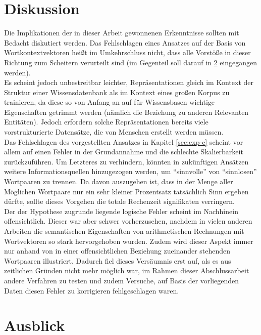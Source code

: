\section{Diskussion}

Die Implikationen der in dieser Arbeit gewonnenen Erkenntnisse sollten mit Bedacht diskutiert werden. Das Fehlschlagen
eines Ansatzes auf der Basis von Wortkontextvektoren heißt im Umkehrschluss nicht, dass alle Vorstöße in dieser
Richtung zum Scheitern verurteilt sind (im Gegenteil soll darauf in \ref{sec:fazit-ausblick} eingegangen werden).\\
Es scheint jedoch unbestreitbar leichter, Repräsentationen gleich im Kontext der Struktur einer Wissensdatenbank als im
Kontext eines großen Korpus zu trainieren, da diese so von Anfang an auf für Wissensbasen wichtige Eigenschaften getrimmt werden
(nämlich die Beziehung zu anderen Relevanten Entitäten). Jedoch erfordern solche Repräsentationen bereits viele
vorstrukturierte Datensätze, die von Menschen erstellt werden müssen.\\

Das Fehlschlagen des vorgestellten Ansatzes in Kapitel \ref{sec:exp-c} scheint vor allem auf einen Fehler in der
Grundannahme und die schlechte Skalierbarkeit zurückzuführen. Um Letzteres zu verhindern, könnten in zukünftigen Ansätzen
weitere Informationsquellen hinzugezogen werden, um ``sinnvolle'' von ``sinnlosen'' Wortpaaren zu trennen. Da davon
auszugehen ist, dass in der Menge aller Möglichen Wortpaare nur ein sehr kleiner Prozentsatz tatsächlich Sinn ergeben
dürfte, sollte dieses Vorgehen die totale Rechenzeit signifikaten verringern.\\
Der der Hypothese zugrunde liegende logische Fehler scheint im Nachhinein offensichtlich. Dieser war aber schwer
vorherzusehen, nachdem in vielen anderen Arbeiten die semantischen Eigenschaften von arithmetischen Rechnungen mit
Wortvektoren so stark hervorgehoben wurden. Zudem wird dieser Aspekt immer nur anhand von in einer offensichtlichen
Beziehung zueinander stehenden Wortpaaren illustriert. Dadurch fiel dieses Versäumnis erst auf, als es aus zeitlichen Gründen
nicht mehr möglich war, im Rahmen dieser Abschlussarbeit andere Verfahren zu testen und zudem Versuche, auf Basis der
vorliegenden Daten diesen Fehler zu korrigieren fehlgeschlagen waren.

\section{Ausblick}\label{sec:fazit-ausblick}


